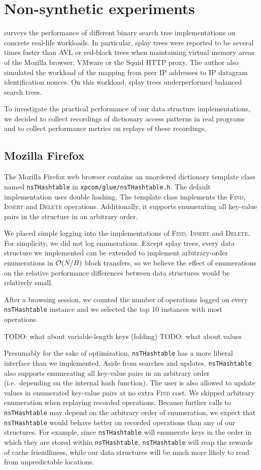 \section{Non-synthetic experiments}
\cite{libavl} surveys the performance of different binary search tree
implementations on concrete real-life workloads. In particular, splay trees
were reported to be several times faster than AVL or red-black trees when
maintaining virtual memory areas of the Mozilla browser, VMware or the Squid
HTTP proxy. The author also simulated the workload of the mapping from peer
IP addresses to IP datagram identification nonces. On this workload, splay
trees underperformed balanced search trees.

To investigate the practical performance of our data structure implementations,
we decided to collect recordings of dictionary access patterns in real programs
and to collect performance metrics on replays of these recordings.

\subsection{Mozilla Firefox}
The Mozilla Firefox web browser contains an unordered dictionary template class
named \texttt{nsTHashtable} in \texttt{xpcom/glue/nsTHashtable.h}.
The default implementation uses double hashing. The template class implements
the \textsc{Find}, \textsc{Insert} and \textsc{Delete} operations. Additionally,
it supports enumerating all key-value pairs in the structure in an arbitrary
order.

We placed simple logging into the implementations of \textsc{Find},
\textsc{Insert} and \textsc{Delete}. For simplicity, we did not log
enumerations. Except splay trees, every data structure we implemented
can be extended to implement arbitrary-order enumerations in $\mathcal{O}(N/B)$ block
transfers, so we believe the effect of enumerations on the relative performance
differences between data structures would be relatively small.

After a browsing session, we counted the number of operations logged
on every \texttt{nsTHashtable} instance and we selected the top 10
instances with most operations.

TODO: what about variable-length keys (folding)
TODO: what about values

Presumably for the sake of optimization, \texttt{nsTHashtable} has a more
liberal interface than we implemented. Aside from searches and updates,
\texttt{nsTHashtable} also supports enumerating all key-value pairs in
an arbitrary order (i.e.\ depending on the internal hash function).
The user is also allowed to update values in enumerated key-value pairs
at no extra \textsc{Find} cost.
We skipped arbitrary enumeration when replaying recorded operations.
Because further calls to \texttt{nsTHashtable} may depend on the arbitrary
order of enumeration, we expect that \texttt{nsTHashtable} would behave
better on recorded operations than any of our structures. For example,
since \texttt{nsTHashtable} will enumerate keys in the order in which they
are stored within \texttt{nsTHashtable}, \texttt{nsTHashtable} will reap
the rewards of cache friendliness, while our data structures will be much
more likely to read from unpredictable locations.

